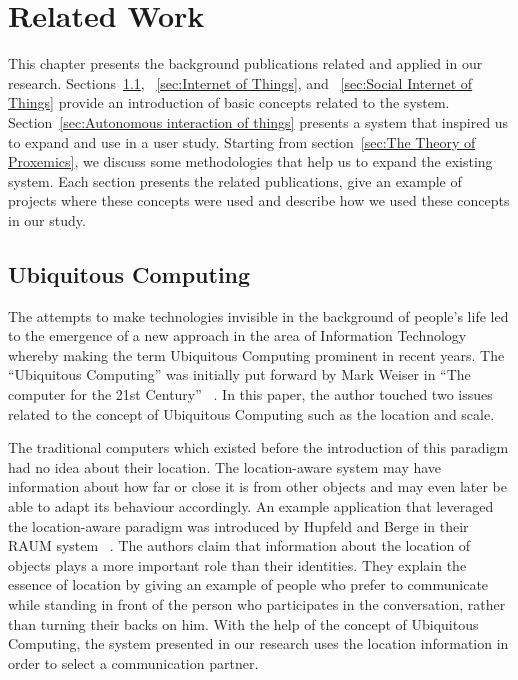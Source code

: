 \chapter{Related Work}
\label{ch:related-work}
This chapter presents the background publications related and applied in our research.
Sections~\ref{sec:Ubiquitous Computing}, ~\ref{sec:Internet of Things}, and ~\ref{sec:Social Internet of Things}
provide an introduction of basic concepts related to the system.
Section~\ref{sec:Autonomous interaction of things} presents a system that inspired us to expand
and use in a user study.
Starting from section~\ref{sec:The Theory of Proxemics}, we discuss some methodologies
that help us to expand the existing system.
Each section presents the related publications, give an example of projects where these concepts
were used and describe how we used these concepts in our study.

\section{Ubiquitous Computing}
\label{sec:Ubiquitous Computing}
The attempts to make technologies invisible in the background of people’s life led to the emergence
of a new approach in the area of Information Technology whereby making the term
Ubiquitous Computing prominent in recent years.
The “Ubiquitous Computing” was initially put forward by Mark Weiser
in “The computer for the 21st Century” ~\cite{weiser1999computer}.
In this paper, the author touched two issues related to the concept of
Ubiquitous Computing such as the location and scale.

The traditional computers which existed before the introduction of this
paradigm had no idea about their location.
The location-aware system may have information about how far or close it is from other
objects and may even later be able to adapt its behaviour accordingly.
An example application that leveraged the location-aware paradigm was introduced by
Hupfeld and Berge in their RAUM system ~\cite{hupfeld2000spatially}.
The authors claim that information about the location of objects plays
a more important role than their identities.
They explain the essence of location by giving an example of people who prefer to communicate
while standing in front of the person who participates in the conversation, rather than turning their backs on him.
With the help of the concept of Ubiquitous Computing, the system presented in our
research uses the location information in order to select a communication partner.

